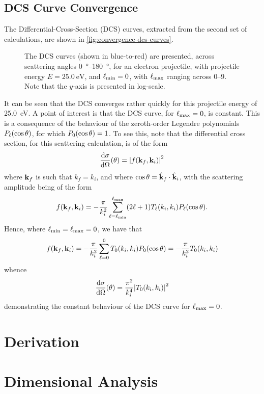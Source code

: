 \documentclass{article}
\begin{document}
\clearpage

\subsection{DCS Curve Convergence}
\label{sec:dcs-curve-conv}

The Differential-Cross-Section (DCS) curves, extracted from the second set
of calculations, are shown in \autoref{fig:convergence-dcs-curves}.

\begin{figure}[h]
  \begin{center}
    
  \end{center}
  \caption[Convergence of DCS Curves]{
    The DCS curves (shown in blue-to-red) are presented, across scattering
    angles \SIrange{0}{180}{\degree}, for an electron projectile, with
    projectile energy $E = \SI{25.0}{\eV}$, and $\ell_{\rm{min}} = 0$, with
    $\ell_{\rm{max}}$ ranging across \SIrange{0}{9}{}.
    Note that the $y$-axis is presented in log-scale.
  }
  \label{fig:convergence-dcs-curves}
\end{figure}

It can be seen that the DCS converges rather quickly for this projectile
energy of \SI{25.0}{\eV}.
A point of interest is that the DCS curve, for $\ell_{\rm{max}} = 0$, is
constant.
This is a consequence of the behaviour of the zeroth-order Legendre polynomials
$P_{\ell}(\cos\theta)$, for which $P_{0}(\cos\theta) = 1$.
To see this, note that the differential cross section, for this scattering
calculation, is of the form
\begin{equation*}
  \dv{\sigma}{\Omega}
  \lr{\theta}
  =
  \abs
  {
    f\lr{\vb{k}_{f}, \vb{k}_{i}}
  }^{2}
\end{equation*}
where $\vb{k}_{f}$ is such that $k_{f} = k_{i}$, and where
$\cos\theta = \hat{\vb{k}}_{f}\cdot\hat{\vb{k}}_{i}$, with the scattering
amplitude being of the form
\begin{equation*}
  f(\vb{k}_{f}, \vb{k}_{i})
  =
  -
  \dfrac{\pi}{k_{i}^{2}}
  \sum_{\ell = \ell_{\rm{min}}}^{\ell_{\rm{max}}}
  (2\ell + 1)
  T_{\ell}(k_{i}, k_{i})
  P_{\ell}(\cos\theta)
  .
\end{equation*}
Hence, where $\ell_{\rm{min}} = \ell_{\rm{max}} = 0$, we have that
\begin{equation*}
  f(\vb{k}_{f}, \vb{k}_{i})
  =
  -
  \dfrac{\pi}{k_{i}^{2}}
  \sum_{\ell = 0}^{0}
  T_{0}(k_{i}, k_{i})
  P_{0}(\cos\theta)
  =
  -
  \dfrac{\pi}{k_{i}^{2}}
  T_{0}(k_{i}, k_{i})
\end{equation*}
whence
\begin{equation*}
  \dv{\sigma}{\Omega}
  \lr{\theta}
  =
  \dfrac{\pi^{2}}{k_{i}^{4}}
  \abs
  {
    T_{0}\lr{k_{i}, k_{i}}
  }^{2}
\end{equation*}
demonstrating the constant behaviour of the DCS curve for $\ell_{\rm{max}} = 0$.

\clearpage

\section{Derivation}
\label{sec:derivation}

\section{Dimensional Analysis}
\label{sec:dimensional-analysis}
\end{document}
